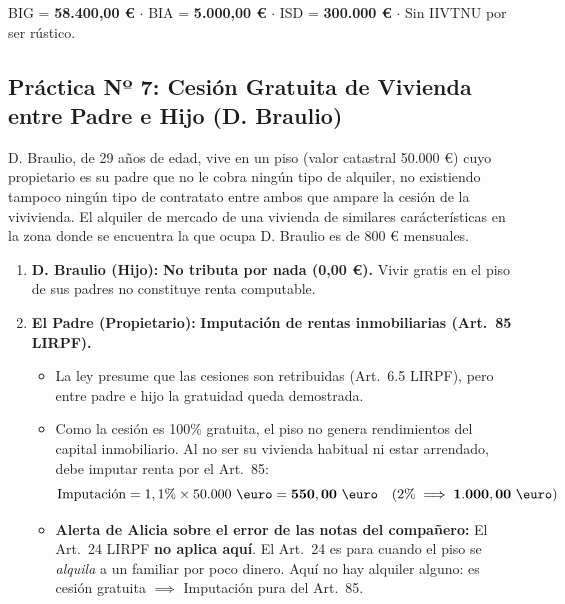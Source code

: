 \documentclass[11pt,a4paper,openany]{article}
\begin{document}
\begin{resultadoBox}[Resultados]
BIG = \textbf{58.400,00 \euro} $\cdot$ BIA = \textbf{5.000,00 \euro} $\cdot$ ISD = \textbf{300.000 \euro} $\cdot$ Sin IIVTNU por ser rústico.
\end{resultadoBox}

\vspace{0.4cm}

\subsection{Práctica Nº 7: Cesión Gratuita de Vivienda entre Padre e Hijo (D. Braulio)}

\begin{enunciadoBox}
D. Braulio, de 29 años de edad, vive en un piso (valor catastral 50.000 \euro{}) cuyo propietario es su padre que no le cobra ningún tipo de alquiler, no existiendo tampoco ningún tipo de contratato entre ambos que ampare la cesión de la vivivienda. El alquiler de mercado de una vivienda de similares carácterísticas en la zona donde se encuentra la que ocupa D. Braulio es de 800 \euro{} mensuales.
\end{enunciadoBox}

\begin{solucionBox}
\begin{enumerate}
    \item \textbf{D. Braulio (Hijo):} \textbf{No tributa por nada (0,00 \euro).} Vivir gratis en el piso de sus padres no constituye renta computable.
    
    \item \textbf{El Padre (Propietario):} \textbf{Imputación de rentas inmobiliarias (Art.~85 LIRPF).}
    \begin{itemize}
        \item La ley presume que las cesiones son retribuidas (Art.~6.5 LIRPF), pero entre padre e hijo la gratuidad queda demostrada.
        \item Como la cesión es 100\% gratuita, el piso no genera rendimientos del capital inmobiliario. Al no ser su vivienda habitual ni estar arrendado, debe imputar renta por el Art.~85:
        $$\text{Imputación} = 1,1\% \times 50.000\text{ \euro} = \mathbf{550,00\text{ \euro}} \quad (2\% \implies \mathbf{1.000,00\text{ \euro}})$$
        \item \textbf{Alerta de Alicia sobre el error de las notas del compañero:} El Art.~24 LIRPF \textbf{no aplica aquí}. El Art.~24 es para cuando el piso se \textit{alquila} a un familiar por poco dinero. Aquí no hay alquiler alguno: es cesión gratuita $\implies$ Imputación pura del Art.~85.
    \end{itemize}
\end{enumerate}
\end{solucionBox}
\end{document}
